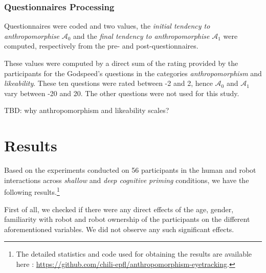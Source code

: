 \documentclass[lettersize, noapacite, twoside, HRI]{apa_HRI}
\newcommand{\ie}{\textit{i.e.}\xspace}
\newcommand{\anti}{{$\mathcal{A}_0$\xspace}}
\newcommand{\antf}{{$\mathcal{A}_1$\xspace}}
\begin{document}

\subsubsection{Questionnaires Processing}
\label{questionnaires_processing}

Questionnaires were coded and two values, the \emph{initial tendency to
anthropomorphise} \anti{} and the \emph{final tendency to anthropomorphise} \antf{}
were computed, respectively from the pre- and post-questionnaires.

These values were computed by a direct sum of the rating provided by the
participants for the Godspeed's questions in the categories
\emph{anthropomorphism} and \emph{likeability}. These ten questions were rated
between -2 and 2, hence \anti{} and \antf{} vary between -20 and 20. The other
questions were not used for this study.

TBD: why anthropomorphism and likeability scales?

\section{Results}

Based on the experiments conducted on 56 participants in the human and robot
interactions across \emph{shallow} and \emph{deep cognitive priming} conditions,
we have the following results.\footnote{The detailed statistics and code used
    for obtaining the results are available here :
\url{https://github.com/chili-epfl/anthropomorphism-eyetracking}.}

First of all, we checked if there were any direct effects of the age, gender, familiarity with robot and robot ownership of the participants on the different aforementioned variables. We did not observe any such significant effects. 


\end{document}
